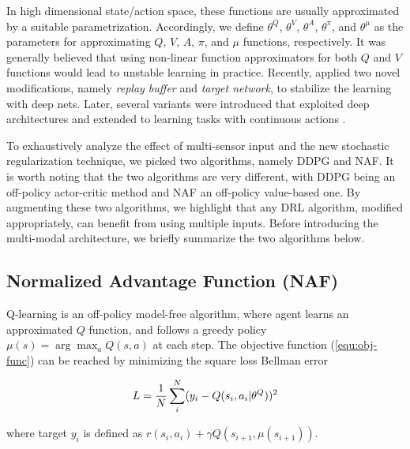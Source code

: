 \documentclass[../thesis.tex]{subfiles}
\begin{document}

In high dimensional state/action space, these functions are usually approximated by a suitable parametrization. Accordingly, we define $\theta^Q$, $\theta^V$, $\theta^A$, $\theta^\pi$, and $\theta^\mu$ as the parameters for approximating $Q$, $V$, $A$, $\pi$, and $\mu$ functions, respectively. It was generally believed that using non-linear function approximators for both $Q$ and $V$ functions would lead to unstable learning in practice. Recently, \citet{mnih2013playing} applied two novel modifications, namely \textit{replay buffer} and \textit{target network}, to stabilize the learning with deep nets. Later, several variants were introduced that exploited deep architectures and extended to learning tasks with continuous actions \cite{DBLP:journals/corr/LillicrapHPHETS15,A3C,CDQN,TRPO}. 

To exhaustively analyze the effect of multi-sensor input and the new stochastic regularization technique, we picked two algorithms, namely DDPG and NAF. It is worth noting that the two algorithms are very different, with DDPG being an off-policy actor-critic method and NAF an off-policy value-based one. By augmenting these two algorithms, we highlight that any DRL algorithm, modified appropriately, can benefit from using multiple inputs. Before introducing the multi-modal architecture, we briefly summarize the two algorithms below.


\subsection{Normalized Advantage Function (NAF)} 
\label{sec:CDQN}

Q-learning \cite{sutton1999policy} is an off-policy model-free algorithm, where agent learns an approximated $Q$ function, and follows a greedy policy $\mu(s)=\arg\max_aQ(s,a)$ at each step. The objective function (\ref{equ:obj-func}) can be reached by minimizing the square loss Bellman error

\begin{align}
\centering
L = \frac{1}{N} \sum_i^N (y_i-Q(s_i,a_i|\theta^Q))^2
\end{align}

where target $y_i$ is defined as $r(s_i,a_i) + \gamma Q(s_{i+1},\mu(s_{i+1}))$.

\end{document}
